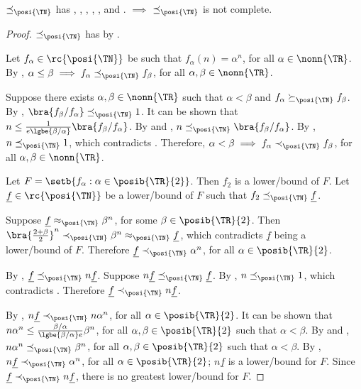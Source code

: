 \documentclass[b5paper, english, oneside]{memoir}
\begin{document}
\begin{theorem}[Incompleteness]
\label{DominanceIsIncomplete}
$\preceq_{\posi{\TN}}$ has , , , , , and . $\implies$ $\preceq_{\posi{\TN}}$ is not complete. 
\end{theorem}

\begin{proof}
$\preceq_{\posi{\TN}}$ has  by .

Let $f_{\alpha} \in \rc{\posi{\TN}}$ be such that $f_{\alpha}(n) = \alpha^n$, for all $\alpha \in \nonn{\TR}$. By , $\alpha \leq \beta \implies f_{\alpha} \preceq_{\posi{\TN}} f_{\beta}$, for all $\alpha, \beta \in \nonn{\TR}$. 

Suppose there exists $\alpha, \beta \in \nonn{\TR}$ such that $\alpha < \beta$ and $f_{\alpha} \succeq_{\posi{\TN}} f_{\beta}$. By , $\bra{f_{\beta} / f_{\alpha}} \preceq_{\posi{\TN}} 1$. It can be shown that $n \leq \frac{1}{e \lgbe{\beta / \alpha}} \bra{f_{\beta} / f_{\alpha}}$. By  and , $n \preceq_{\posi{\TN}} \bra{f_{\beta} / f_{\alpha}}$. By , $n \preceq_{\posi{\TN}} 1$, which contradicts . Therefore, $\alpha < \beta \implies f_{\alpha} \prec_{\posi{\TN}} f_{\beta}$, for all $\alpha, \beta \in \nonn{\TR}$.

Let $F = \setb{f_{\alpha} : \alpha \in \posib{\TR}{2}}$.  Then $f_2$ is a lower\-/bound of $F$. Let $\underline{f} \in \rc{\posi{\TN}}$ be a lower\-/bound of $F$ such that $f_2 \preceq_{\posi{\TN}} \underline{f}$. 

Suppose $\underline{f} \approx_{\posi{\TN}} \beta^n$, for some $\beta \in \posib{\TR}{2}$. Then $\bra{\frac{2 + \beta}{2}}^n \prec_{\posi{\TN}} \beta^n \approx_{\posi{\TN}} \underline{f}$, which contradicts $\underline{f}$ being a lower\-/bound of $F$. Therefore $\underline{f} \prec_{\posi{\TN}} \alpha^n$, for all $\alpha \in \posib{\TR}{2}$. 

By , $\underline{f} \preceq_{\posi{\TN}} n \underline{f}$. Suppose $n \underline{f} \preceq_{\posi{\TN}} \underline{f}$. By , $n \preceq_{\posi{\TN}} 1$, which contradicts . Therefore $\underline{f} \prec_{\posi{\TN}} n \underline{f}$.

By , $n \underline{f} \prec_{\posi{\TN}} n \alpha^n$, for all $\alpha \in \posib{\TR}{2}$. It can be shown that $n \alpha^n \leq \frac{\beta / \alpha}{\lgbe{\beta / \alpha} e} \beta^n$, for all $\alpha, \beta \in \posib{\TR}{2}$ such that $\alpha < \beta$. By  and , $n \alpha^n \preceq_{\posi{\TN}} \beta^n$, for all $\alpha, \beta \in \posib{\TR}{2}$ such that $\alpha < \beta$. By , $n \underline{f} \prec_{\posi{\TN}} \alpha^n$, for all $\alpha \in \posib{\TR}{2}$; $n \underline{f}$ is a lower\-/bound for $F$. Since $\underline{f} \prec_{\posi{\TN}} n \underline{f}$, there is no greatest lower\-/bound for $F$. 

\end{proof}
\end{document}
